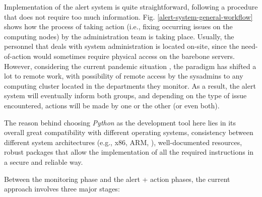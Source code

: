 \documentclass[conference]{IEEEtran}
\begin{document}
Implementation of the alert system is quite straightforward, following a procedure that does not require too much information. Fig. \ref{alert-system-general-workflow} shows how the process of taking action (i.e., fixing occurring issues on the computing nodes) by the administration team is taking place. Usually, the personnel that deals with system administration is located on-site, since the need-of-action would sometimes require physical access on the barebone servers. However, considering the current pandemic situation \cite{ciotti2020covid}, the paradigm has shifted a lot to remote work, with possibility of remote access by the sysadmins \cite{sallow2020client} to any computing cluster located in the departments they monitor. As a result, the alert system will eventually inform both groups, and depending on the type of issue encountered, actions will be made by one or the other (or even both).
\par The reason behind choosing \emph{Python} \cite{python3} as the development tool here lies in its overall great compatibility with different operating systems, consistency between different system architectures (e.g., x86, ARM, \cite{blem2013power}), well-documented resources, robust packages that allow the implementation of all the required instructions in a secure and reliable way.
\par Between the monitoring phase and the alert + action phases, the current approach involves three major stages:
\end{document}
